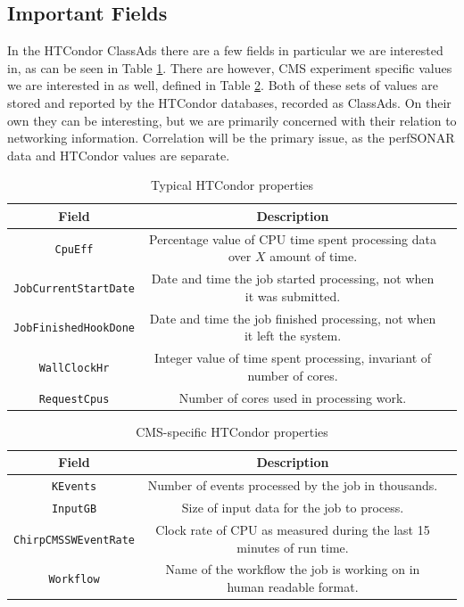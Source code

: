 \documentclass[sigconf]{acmart}
\begin{document}
\subsection{Important Fields}
In the HTCondor ClassAds there are a few fields in particular we are interested in, as can be seen in Table \ref{tab:htcondor}. There are however, CMS experiment specific values we are interested in as well, defined in Table \ref{tab:cmscondor}. Both of these sets of values are stored and reported by the HTCondor databases, recorded as ClassAds. On their own they can be interesting, but we are primarily concerned with their relation to networking information. Correlation will be the primary issue, as the perfSONAR data and HTCondor values are separate.
\begin{table}
	\caption{Typical HTCondor properties}
	\label{tab:htcondor}
	\begin{tabular}{ccl}
		\toprule
		Field &Description \\
		\midrule
		\texttt{CpuEff} & \parbox{4.5cm}{Percentage value of CPU time spent processing data over $X$ amount of time.} \\
		\midrule
		\texttt{JobCurrentStartDate}& \parbox{4.5cm}{Date and time the job started processing, not when it was submitted.} \\
		\midrule
		\texttt{JobFinishedHookDone}& \parbox{4.5cm}{Date and time the job finished processing, not when it left the system.} \\
		\midrule
		\texttt{WallClockHr}& \parbox{4.5cm}{Integer value of time spent processing, invariant of number of cores.} \\
		\midrule
		\texttt{RequestCpus}& \parbox{4.5cm}{Number of cores used in processing work.} \\
		\bottomrule
	\end{tabular}
\end{table}

\begin{table}
	\caption{CMS-specific HTCondor properties}
	\label{tab:cmscondor}
	\begin{tabular}{ccl}
		\toprule
		Field &Description \\
		\midrule
		\texttt{KEvents} & \parbox{4.5cm}{Number of events processed by the job in thousands.} \\
		\midrule
		\texttt{InputGB}& \parbox{4.5cm}{Size of input data for the job to process.} \\
		\midrule
		\texttt{ChirpCMSSWEventRate}& \parbox{4.5cm}{Clock rate of CPU as measured during the last 15 minutes of run time.} \\
		\midrule
		\texttt{Workflow}& \parbox{4.5cm}{Name of the workflow the job is working on in human readable format.} \\
		\bottomrule
	\end{tabular}
\end{table}
\end{document}
